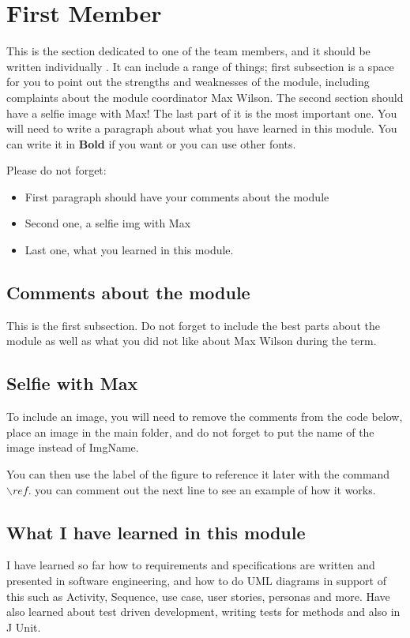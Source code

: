 \section{First Member}
This is the section dedicated to one of the team members, and it should be written individually . It can include a range of things; first subsection is a space for you to point out the strengths and weaknesses of the module, including complaints about the module coordinator Max Wilson. The second section should have a selfie image with Max! The last part of it is the most important one. You will need to write a paragraph about what you have learned in this module. You can write it in \textbf{Bold} if you want or you can use other fonts. 

Please do not forget:
\begin{itemize}
	\item First paragraph should have your comments about the module
	\item Second one, a selfie img with Max
	\item Last one, what you learned in this module.
\end{itemize}

\subsection{Comments about the module}
This is the first subsection. Do not forget to include the best parts about the module as well as what you did not like about Max Wilson during the term.

\subsection{Selfie with Max}

To include an image, you will need to remove the comments from the code below, place an image in the main folder, and do not forget to put the name of the image instead of ImgName. 


You can then use the label of the figure to reference it later with the command ${\backslash}ref$. you can comment out the next line to see an example of how it works.


\subsection{What I have learned in this module}
I have learned so far how to requirements and specifications are written and presented in software engineering, and how to do UML diagrams in support of this such as  Activity, Sequence, use case, user stories, personas and more. Have also learned about test driven development, writing tests for methods and also in J Unit.
